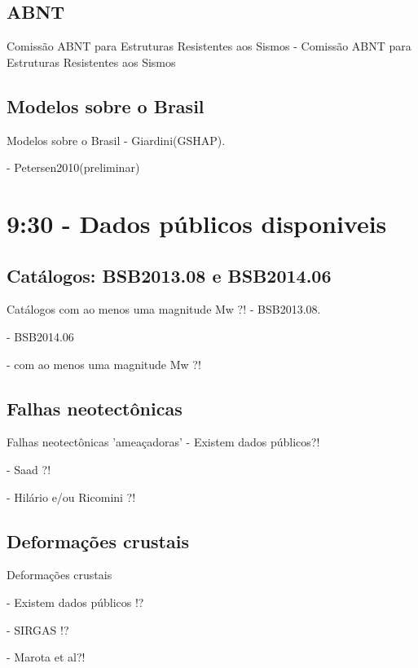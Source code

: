 \documentclass[ucs,8pt]{beamer}
\begin{document}
	\subsection{ABNT}
	\begin{frame}{Comissão ABNT para Estruturas Resistentes aos Sismos}
		- Comissão ABNT para Estruturas Resistentes aos Sismos
	\end{frame}
	
	\subsection{Modelos sobre o Brasil}
	\begin{frame}{Modelos sobre o Brasil}
		- Giardini(GSHAP).	
		
		- Petersen2010(preliminar)
	\end{frame}




\section{9:30 - Dados públicos disponiveis}

	\subsection{Catálogos: BSB2013.08 e BSB2014.06}
	\begin{frame}{Catálogos com ao menos uma magnitude Mw ?!}
		- BSB2013.08.	
		
		- BSB2014.06
		
		- com ao menos uma magnitude Mw ?!
	\end{frame}


	\subsection{Falhas neotectônicas}
	\begin{frame}{Falhas neotectônicas 'ameaçadoras'}
		- Existem dados públicos?!
		
		- Saad ?!
		
		- Hilário e/ou Ricomini ?!
	\end{frame}

	\subsection{Deformações crustais}
	\begin{frame}{Deformações crustais}
		
		- Existem dados públicos !?	
		
		- SIRGAS !?
		
		- Marota et al?!
	\end{frame}
\end{document}
